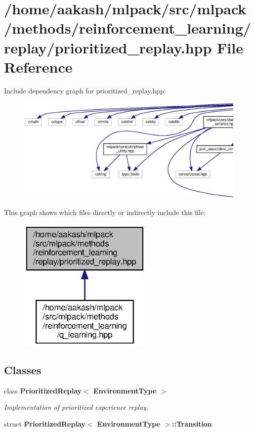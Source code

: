 \section{/home/aakash/mlpack/src/mlpack/methods/reinforcement\+\_\+learning/replay/prioritized\+\_\+replay.hpp File Reference}
\label{prioritized__replay_8hpp}
Include dependency graph for prioritized\+\_\+replay.\+hpp\+:
\nopagebreak
\begin{figure}[H]
\begin{center}
\leavevmode
\includegraphics[width=350pt]{prioritized__replay_8hpp__incl}
\end{center}
\end{figure}
This graph shows which files directly or indirectly include this file\+:
\nopagebreak
\begin{figure}[H]
\begin{center}
\leavevmode
\includegraphics[width=185pt]{prioritized__replay_8hpp__dep__incl}
\end{center}
\end{figure}
\subsection*{Classes}
\begin{DoxyCompactItemize}
\item 
class \textbf{ Prioritized\+Replay$<$ Environment\+Type $>$}
\begin{DoxyCompactList}\small\item\em Implementation of prioritized experience replay. \end{DoxyCompactList}\item 
struct \textbf{ Prioritized\+Replay$<$ Environment\+Type $>$\+::\+Transition}
\end{DoxyCompactItemize}
